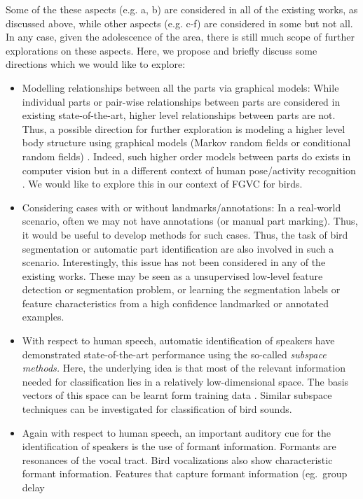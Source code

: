 \documentclass{article}
\begin{document}
Some of the these aspects (e.g. a, b) are considered  in all of the existing works, as discussed above, while other aspects (e.g. c-f)  are considered in some but not all. In any case, given the adolescence of the area, there is still much scope of further explorations on these aspects. Here, we propose and briefly discuss some directions which we would like to explore: 
\begin{itemize}
\item Modelling relationships between all the parts via graphical models: While individual parts or pair-wise relationships between parts are considered in existing state-of-the-art, higher level relationships between parts are not. Thus, a possible direction for further exploration is modeling a higher level body structure using graphical models (Markov random fields or conditional random fields) \cite{mrfbook,hmrf,mrf,crf,crf1}. Indeed, such higher order models between parts do exists in computer vision but in a different context of human pose/activity recognition \cite{mrfpose}. We would like to explore this in our context of FGVC for birds.
\item Considering cases with or without landmarks/annotations: In a real-world scenario, often we may not have annotations (or manual part marking). Thus, it would be useful to develop methods for such cases. Thus, the task of bird segmentation or automatic part identification are also involved in such a scenario. Interestingly, this issue has not been considered in any of the existing works. These may be seen as a unsupervised low-level feature detection or segmentation problem, or learning the segmentation labels or feature characteristics from a high confidence landmarked or annotated examples.
\item With respect to human speech, automatic identification of speakers have
demonstrated state-of-the-art performance using the so-called \emph{subspace
methods.} Here, the underlying idea is that most of the relevant information
needed for classification 
lies in a relatively low-dimensional space. The basis vectors of this space can
be learnt form training data \cite{dehak_ivector}. Similar subspace techniques
can be investigated for classification of bird sounds.
\item Again with respect to human speech, an important auditory cue for the
identification of speakers is the use of formant information. Formants are
resonances of the vocal tract. Bird vocalizations also show characteristic
formant information. Features that capture formant information (eg.~group delay

\end{itemize}
\end{document}
